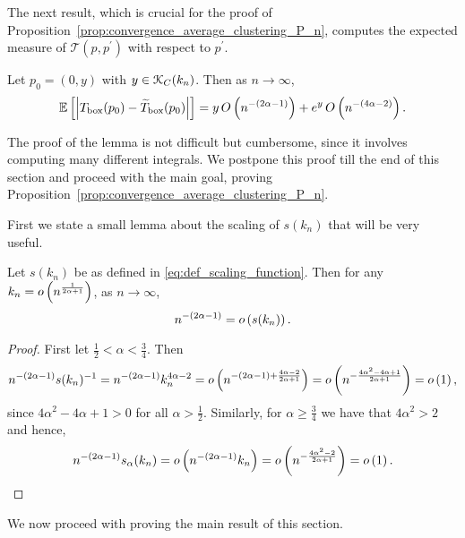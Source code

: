   

The next result, which is crucial for the proof of Proposition~\ref{prop:convergence_average_clustering_P_n}, computes the expected measure of $\mathcal{T}(p,p^\prime)$ with respect to $p^\prime$. 

\begin{lemma}\label{lem:clustering_error_T_term}
Let $p_0 = (0,y)$ with $y \in {\mathcal K}_{C}(k_n)$. Then as $n \to \infty$,
\[
	\mathbb{E}\left[\left|T_{\text{box}}(p_0) - \widetilde{T}_{\text{box}}(p_0)\right|\right]
	= y \, O\left(n^{-(2\alpha - 1)}\right) + e^{y}\,O\left(n^{-(4\alpha-2)}\right).
\]
\end{lemma}

The proof of the lemma is not difficult but cumbersome, since it involves computing many different integrals. We postpone this proof till the end of this section and proceed with the main goal, proving Proposition~\ref{prop:convergence_average_clustering_P_n}. 

First we state a small lemma about the scaling of $s(k_n)$ that will be very useful.  

\begin{lemma}\label{lem:scaling_s_alpha}
Let $s(k_n)$ be as defined in \eqref{eq:def_scaling_function}. Then for any $k_n = o\left(n^{\frac{1}{2\alpha + 1}}\right)$, as $n \to \infty$,
\[
	n^{-(2\alpha - 1)} = o\left(s(k_n)\right).
\]
\end{lemma}

\begin{proof}
First let $\frac{1}{2} < \alpha < \frac{3}{4}$. Then
\[
	n^{-(2\alpha - 1)}s(k_n)^{-1} = n^{-(2\alpha -1)}k_n^{4\alpha - 2}
	= o\left(n^{-(2\alpha - 1) + \frac{4\alpha - 2}{2\alpha + 1}}\right) 
	= o\left(n^{-\frac{4\alpha^2 - 4\alpha + 1}{2\alpha + 1}}\right)
	= o\left(1\right),
\]
since $4\alpha^2 - 4\alpha + 1 > 0$ for all $\alpha > \frac{1}{2}$. Similarly, for $\alpha \ge \frac{3}{4}$ we have
that $4\alpha^2 > 2$ and hence,
\[
	n^{-(2\alpha - 1)} s_{\alpha}(k_n) = o\left(n^{-(2\alpha - 1)} k_n\right) = o\left(n^{-\frac{4\alpha^2 - 2}{2\alpha + 1}}\right)
	= o\left(1\right).
\]
\end{proof}

We now proceed with proving the main result of this section.

